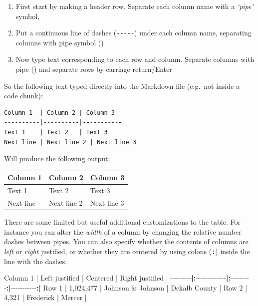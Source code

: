 \documentclass[
]{book}
\newenvironment{Shaded}{\begin{snugshade}}{\end{snugshade}}
\newcommand{\DecValTok}[1]{\textcolor[rgb]{0.00,0.00,0.81}{#1}}
\newcommand{\ErrorTok}[1]{\textcolor[rgb]{0.64,0.00,0.00}{\textbf{#1}}}
\newcommand{\NormalTok}[1]{#1}
\newcommand{\SpecialCharTok}[1]{\textcolor[rgb]{0.00,0.00,0.00}{#1}}
\providecommand{\tightlist}{%
  \setlength{\itemsep}{0pt}\setlength{\parskip}{0pt}}
\begin{document}
\begin{enumerate}
\def\labelenumi{\arabic{enumi}.}
\tightlist
\item
  First start by making a header row. Separate each column name with a \emph{`pipe'} symbol, \texttt{\textbar{}}
\item
  Put a continuous line of dashes (\texttt{-\/-\/-\/-\/-}) under each column name, separating columns with pipe symbol (\texttt{\textbar{}})
\item
  Now type text corresponding to each row and column. Separate columns with pipe (\texttt{\textbar{}}) and separate rows by carriage return/Enter
\end{enumerate}

So the following text typed directly into the Markdown file (e.g.~not inside a code chunk):

\begin{verbatim}
Column 1  | Column 2 | Column 3
----------|----------|-----------
Text 1    | Text 2   | Text 3
Next line | Next line 2 | Next line 3
\end{verbatim}

Will produce the following output:

\begin{longtable}[]{@{}lll@{}}
\toprule()
Column 1 & Column 2 & Column 3 \\
\midrule()
\endhead
Text 1 & Text 2 & Text 3 \\
Next line & Next line 2 & Next line 3 \\
\bottomrule()
\end{longtable}

There are some limited but useful additional customizations to the table. For instance you can alter the \emph{width} of a column by changing the relative number dashes between pipes. You can also specify whether the contents of columns are \emph{left} or \emph{right} justified, or whether they are centered by using colons (\texttt{:}) inside the line with the dashes.

\begin{Shaded}
\begin{Highlighting}[]
\NormalTok{Column }\DecValTok{1} \SpecialCharTok{|}\NormalTok{ Left justified }\SpecialCharTok{|}\NormalTok{ Centered }\SpecialCharTok{|}\NormalTok{ Right justified }\SpecialCharTok{|}
\SpecialCharTok{{-}{-}{-}{-}{-}{-}{-}{-}{-}}\ErrorTok{|:}\SpecialCharTok{{-}{-}{-}{-}{-}{-}{-}{-}{-}{-}{-}{-}{-}}\ErrorTok{|:}\SpecialCharTok{{-}{-}{-}{-}{-}{-}{-}{-}{-}}\ErrorTok{:|}\SpecialCharTok{{-}{-}{-}{-}{-}{-}{-}{-}{-}{-}{-}}\ErrorTok{:|}
\NormalTok{Row }\DecValTok{1}  \SpecialCharTok{|} \DecValTok{1}\NormalTok{,}\DecValTok{024}\NormalTok{,}\DecValTok{477} \SpecialCharTok{|}\NormalTok{ Johnson }\SpecialCharTok{\&}\NormalTok{ Johnson }\SpecialCharTok{|}\NormalTok{ Dekalb County }\SpecialCharTok{|}
\NormalTok{Row }\DecValTok{2} \SpecialCharTok{|} \DecValTok{4}\NormalTok{,}\DecValTok{321} \SpecialCharTok{|}\NormalTok{ Frederick }\SpecialCharTok{|}\NormalTok{ Mercer  }\SpecialCharTok{|}
\end{Highlighting}
\end{Shaded}
\end{document}
